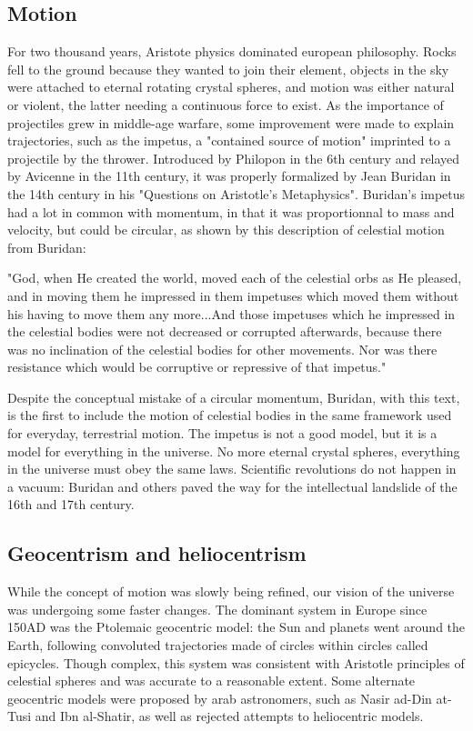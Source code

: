 \subsection{Motion}
For two thousand years, Aristote physics dominated european philosophy. Rocks fell to the ground because they wanted to join their element, objects in the sky were attached to eternal rotating crystal spheres, and motion was either natural or violent, the latter needing a continuous force to exist. As the importance of projectiles grew in middle-age warfare, some improvement were made to explain trajectories, such as the impetus, a "contained source of motion" imprinted to a projectile by the thrower. Introduced by Philopon in the 6th century and relayed by Avicenne in the 11th century, it was properly formalized by Jean Buridan in the 14th century in his "Questions on Aristotle's Metaphysics". Buridan's impetus had a lot in common with momentum, in that it was proportionnal to mass and velocity, but could be circular, as shown by this description of celestial motion from Buridan:

"God, when He created the world, moved each of the celestial orbs as He pleased, and in moving them he impressed in them impetuses which moved them without his having to move them any more...And those impetuses which he impressed in the celestial bodies were not decreased or corrupted afterwards, because there was no inclination of the celestial bodies for other movements. Nor was there resistance which would be corruptive or repressive of that impetus." \citep{Clagett1959}

Despite the conceptual mistake of a circular momentum, Buridan, with this text, is the first to include the motion of celestial bodies in the same framework used for everyday, terrestrial motion. The impetus is not a good model, but it is a model for everything in the universe. No more eternal crystal spheres, everything in the universe must obey the same laws. Scientific revolutions do not happen in a vacuum: Buridan and others paved the way for the intellectual landslide of the 16th and 17th century.

\subsection{Geocentrism and heliocentrism}

While the concept of motion was slowly being refined, our vision of the universe was undergoing some faster changes. The dominant system in Europe since 150AD was the Ptolemaic geocentric model: the Sun and planets went around the Earth, following convoluted trajectories made of circles within circles called epicycles. Though complex, this system was consistent with Aristotle principles of celestial spheres and was accurate to a reasonable extent. Some alternate geocentric models were proposed by arab astronomers, such as Nasir ad-Din at-Tusi and Ibn al-Shatir, as well as rejected attempts to heliocentric models.

